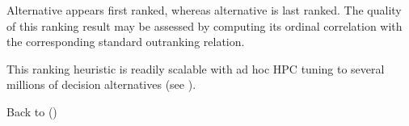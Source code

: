 \documentclass[a4paper,10pt,english]{sphinxhowto}
\begin{document}
Alternative  appears first ranked, whereas alternative  is last ranked. The quality of this ranking result may be assessed by computing its ordinal correlation with the corresponding standard outranking relation.

\begin{sphinxVerbatim}[commandchars=\\\{\},numbers=left,firstnumber=1,stepnumber=1]
  
\end{sphinxVerbatim}

This ranking heuristic is readily scalable with ad hoc HPC tuning to several millions of decision alternatives (see ).

Back to {\hyperref[\detokenize{tutorial:tutorial-label}]{}} ()
\end{document}
